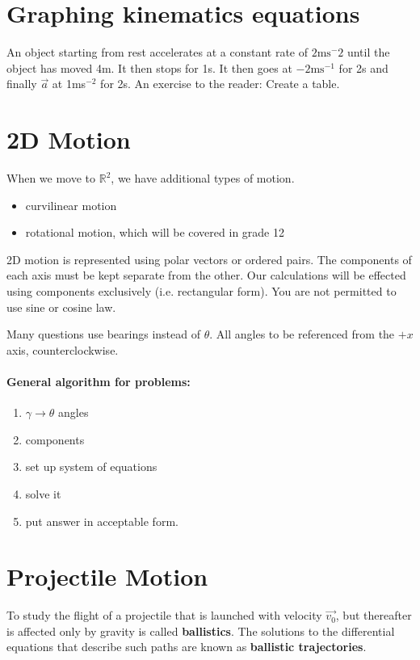 \documentclass[letterpaper]{article}
\begin{document}
\section{Graphing kinematics equations}
An object starting from rest accelerates at a constant rate of $2\text{ms}^-2$  until
the object has moved 4m. It then stops for 1s.
It then goes at $-2\text{ms}^{-1}$ for 2s and finally $\vec{a}$ at 1ms$^{-2}$
for 2s.
An exercise to the reader:
Create a table.

\section{2D Motion}

When we move to $\mathbb{R}^2$, we have additional types of motion.
\begin{itemize}
    \item curvilinear motion
    \item rotational motion, which will be covered in grade 12
\end{itemize}

2D motion is represented using polar vectors or ordered pairs.
The components of each axis must be kept separate from the other.
Our calculations will be effected using components exclusively 
(i.e. rectangular form). You are not permitted to use sine or cosine law.

Many questions use bearings instead of $\theta$. All angles to be referenced
from the $+x$ axis, counterclockwise.

\paragraph{General algorithm for problems:}
\begin{enumerate}
    \item $\gamma \to \theta$ angles
    \item components
    \item set up system of equations
    \item solve it
    \item put answer in acceptable form.
\end{enumerate}

\section{Projectile Motion}
To study the flight of a projectile that is launched with velocity 
$\vec{v_0}$, but thereafter is affected only by gravity is called
{\bf ballistics}. The solutions to the differential equations that describe
such paths are known as {\bf ballistic trajectories}.
\end{document}
